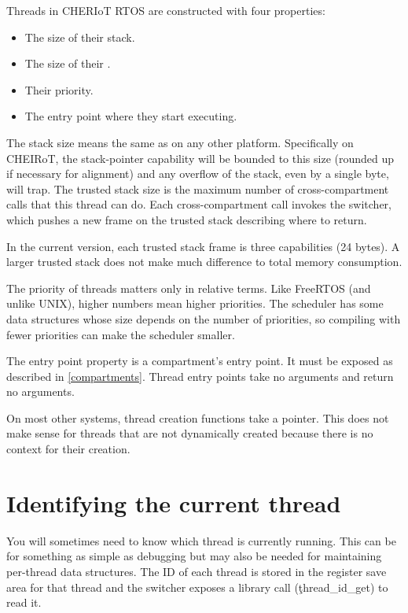 Threads in CHERIoT RTOS are constructed with four properties:

\begin{itemize}
	\item{The size of their stack.}
	\item{The size of their .}
	\item{Their priority.}
	\item{The entry point where they start executing.}
\end{itemize}

The stack size means the same as on any other platform.
Specifically on CHEIRoT, the stack-pointer capability will be bounded to this size (rounded up if necessary for alignment) and any overflow of the stack, even by a single byte, will trap.
The trusted stack size is the maximum number of cross-compartment calls that this thread can do.
Each cross-compartment call invokes the switcher, which pushes a new frame on the trusted stack describing where to return.

\begin{note}
In the current version, each trusted stack frame is three capabilities (24 bytes).
A larger trusted stack does not make much difference to total memory consumption.
\end{note}

The priority of threads matters only in relative terms.
Like FreeRTOS (and unlike UNIX), higher numbers mean higher priorities.
The scheduler has some data structures whose size depends on the number of priorities, so compiling with fewer priorities can make the scheduler smaller.

The entry point property is a compartment's entry point.
It must be exposed as described in \ref{compartments}.
Thread entry points take no arguments and return no arguments.

On most other systems, thread creation functions take a pointer.
This does not make sense for threads that are not dynamically created because there is no context for their creation.

\section{Identifying the current thread}

You will sometimes need to know which thread is currently running.
This can be for something as simple as debugging but may also be needed for maintaining per-thread data structures.
The ID of each thread is stored in the register save area for that thread and the switcher exposes a library call (\c{thread_id_get}) to read it.

